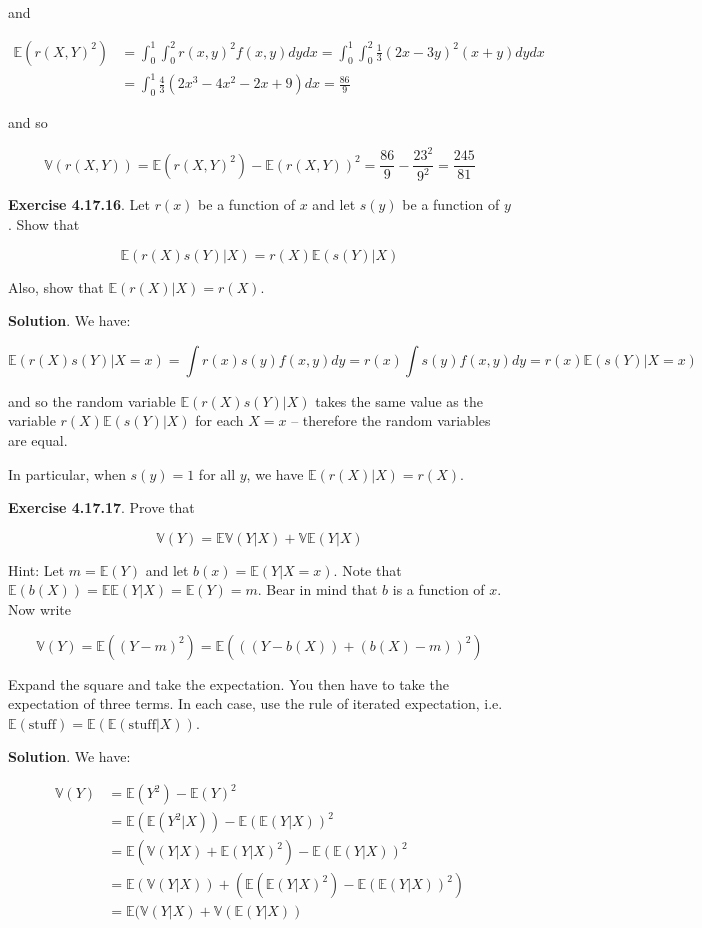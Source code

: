 and

\begin{align*}
\mathbb{E}(r(X, Y)^{2}) 
& = \int_{0}^{1} \int_{0}^{2} r(x, y)^{2} f(x, y) dy dx 
  = \int_{0}^{1} \int_{0}^{2} \frac{1}{3}(2x - 3y)^{2}(x + y) dy dx 
\\
& = \int_{0}^{1} \frac{4}{3}(2x^{3} - 4x^{2} - 2x + 9) dx
  = \frac{86}{9}
\end{align*}

and so

\[ \mathbb{V}(r(X, Y)) = \mathbb{E}(r(X, Y)^{2}) - \mathbb{E}(r(X, Y))^{2} = \frac{86}{9} - \frac{23^{2}}{9^{2}} = \frac{245}{81} \]

\textbf{Exercise 4.17.16}. Let \(r(x)\) be a function of \(x\) and let
\(s(y)\) be a function of \(y\). Show that

\[ \mathbb{E}(r(X) s(Y) | X) = r(X) \mathbb{E}(s(Y) | X) \]

Also, show that \(\mathbb{E}(r(X) | X) = r(X)\).

\textbf{Solution}. We have:

\[ \mathbb{E}(r(X) s(Y) | X = x) = \int r(x) s(y) f(x, y) dy = r(x) \int s(y) f(x, y) dy = r(x) \mathbb{E}(s(Y) | X = x) \]

and so the random variable \(\mathbb{E}(r(X) s(Y) | X)\) takes the same
value as the variable \(r(X) \mathbb{E}(s(Y) | X)\) for each \(X = x\)
-- therefore the random variables are equal.

In particular, when \(s(y) = 1\) for all \(y\), we have
\(\mathbb{E}(r(X) | X) = r(X)\).

\textbf{Exercise 4.17.17}. Prove that

\[ \mathbb{V}(Y) = \mathbb{E} \mathbb{V} (Y | X) + \mathbb{V} \mathbb{E} (Y | X) \]

Hint: Let \(m = \mathbb{E}(Y)\) and let
\(b(x) = \mathbb{E}(Y | X = x)\). Note that
\(\mathbb{E}(b(X)) = \mathbb{E} \mathbb{E}(Y | X) = \mathbb{E}(Y) = m\).
Bear in mind that \(b\) is a function of \(x\). Now write

\[\mathbb{V}(Y) = \mathbb{E}((Y - m)^{2}) = \mathbb{E}(((Y - b(X)) + (b(X) - m))^{2})\]

Expand the square and take the expectation. You then have to take the
expectation of three terms. In each case, use the rule of iterated
expectation,
i.e.~\(\mathbb{E}(\text{stuff}) = \mathbb{E}(\mathbb{E}(\text{stuff} | X))\).

\textbf{Solution}. We have:

\begin{align*}
\mathbb{V}(Y) &= \mathbb{E}(Y^{2}) - \mathbb{E}(Y)^{2} \\
&= \mathbb{E}(\mathbb{E}(Y^{2} | X)) - \mathbb{E}(\mathbb{E}(Y | X))^{2} \\
&= \mathbb{E}\left( \mathbb{V}(Y | X) + \mathbb{E}(Y | X)^{2} \right) - \mathbb{E}(\mathbb{E}(Y | X))^{2} \\
&= \mathbb{E}(\mathbb{V}(Y | X)) + \left( \mathbb{E}(\mathbb{E}(Y | X)^{2}) - \mathbb{E}(\mathbb{E}(Y | X))^{2} \right) \\
&= \mathbb{E} (\mathbb{V}(Y | X) + \mathbb{V}(\mathbb{E}(Y | X))
\end{align*}

